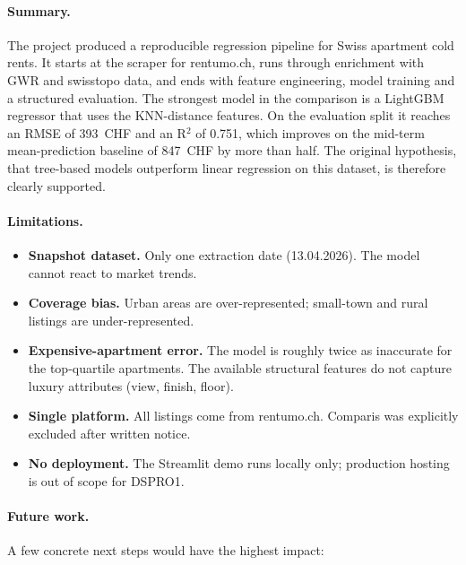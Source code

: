 \documentclass[11pt,a4paper]{article}
\begin{document}
\paragraph{Summary.}
The project produced a reproducible regression pipeline for Swiss apartment cold rents. It starts at the scraper for rentumo.ch, runs through enrichment with GWR and swisstopo data, and ends with feature engineering, model training and a structured evaluation. The strongest model in the comparison is a LightGBM regressor that uses the KNN-distance features. On the evaluation split it reaches an RMSE of 393~CHF and an R$^2$ of 0.751, which improves on the mid-term mean-prediction baseline of 847~CHF by more than half. The original hypothesis, that tree-based models outperform linear regression on this dataset, is therefore clearly supported.

\paragraph{Limitations.}
\begin{itemize}
    \item \textbf{Snapshot dataset.} Only one extraction date (13.04.2026). The model cannot react to market trends.
    \item \textbf{Coverage bias.} Urban areas are over-represented; small-town and rural listings are under-represented.
    \item \textbf{Expensive-apartment error.} The model is roughly twice as inaccurate for the top-quartile apartments. The available structural features do not capture luxury attributes (view, finish, floor).
    \item \textbf{Single platform.} All listings come from rentumo.ch. Comparis was explicitly excluded after written notice.
    \item \textbf{No deployment.} The Streamlit demo runs locally only; production hosting is out of scope for DSPRO1.
\end{itemize}

\paragraph{Future work.}
A few concrete next steps would have the highest impact:
\end{document}
